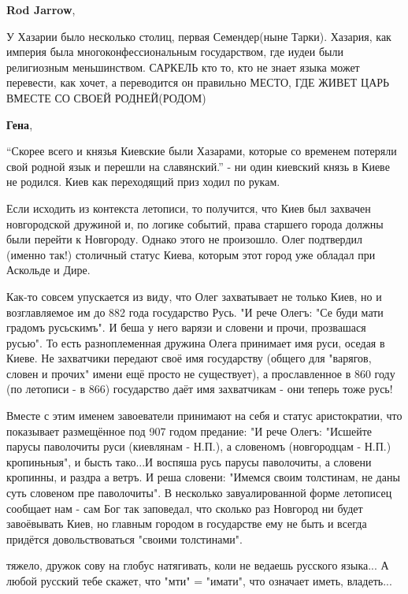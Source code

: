 \begin{itemize}
\begin{itemize}
\textbf{Rod Jarrow}, 

У Хазарии было несколько столиц, первая Семендер(ныне Тарки). Хазария, как
империя была многоконфессиональным государством, где иудеи были религиозным
меньшинством. САРКЕЛЬ кто то, кто не знает языка может перевести, как хочет,
а переводится он правильно МЕСТО, ГДЕ ЖИВЕТ ЦАРЬ ВМЕСТЕ СО СВОЕЙ РОДНЕЙ(РОДОМ)

\textbf{Гена}, 

\enquote{Скорее всего и князья Киевские были Хазарами, которые со временем потеряли
свой родной язык и перешли на славянский.} - ни один киевский князь в Киеве не
родился. Киев как переходящий приз ходил по рукам.

\end{itemize} %


Если исходить из контекста летописи, то получится, что Киев был захвачен
новгородской дружиной и, по логике событий, права старшего города должны были
перейти к Новгороду. Однако этого не произошло. Олег подтвердил (именно так!)
столичный статус Киева, которым этот город уже обладал при Аскольде и Дире.

Как-то совсем упускается из виду, что Олег захватывает не только Киев, но и
возглавляемое им до 882 года государство Русь. "И рече Олегъ: "Се буди мати
градомъ русьскимъ". И беша у него варязи и словени и прочи, прозвашася русью".
То есть разноплеменная дружина Олега принимает имя руси, оседая в Киеве. Не
захватчики передают своё имя государству (общего для "варягов, словен и прочих"
имени ещё просто не существует), а прославленное в 860 году (по летописи - в
866) государство даёт имя захватчикам - они теперь тоже русь!

Вместе с этим именем завоеватели принимают на себя и статус аристократии, что
показывает размещённое под 907 годом предание: "И рече Олегъ: "Исшейте парусы
паволочиты руси (киевлянам - Н.П.), а словеномъ (новгородцам - Н.П.)
кропиньныя", и бысть тако...И воспяша русь парусы паволочиты, а словени
кропинны, и раздра а ветръ. И реша словени: "Имемся своим толстинам, не даны
суть словеном пре паволочиты". В несколько завуалированной форме летописец
сообщает нам - сам Бог так заповедал, что сколько раз Новгород ни будет
завоёвывать Киев, но главным городом в государстве ему не быть и всегда
придётся довольствоваться "своими толстинами".


тяжело, дружок сову на глобус натягивать, коли не ведаешь русского языка... А
любой русский тебе скажет, что "мти" = "имати", что означает иметь, владеть...


\end{itemize}
